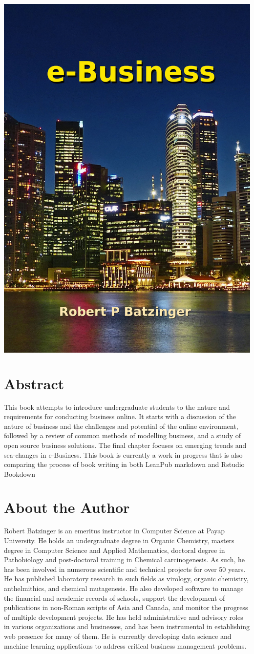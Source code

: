 \documentclass[]{book}
\begin{document}
\includegraphics[width=0.5\linewidth]{images/cover11}

\hypertarget{abstract}{%
\section*{Abstract}\label{abstract}}

This book attempts to introduce undergraduate students to the nature and requirements for conducting business online. It starts with a discussion of the nature of business and the challenges and potential of the online environment, followed by a review of common methods of modelling business, and a study of open source business solutions.
The final chapter focuses on emerging trends and sea-changes in e-Business. This book is currently a work in progress that is also comparing the process of book writing in both LeanPub markdown and Rstudio Bookdown

\hypertarget{about-the-author}{%
\section*{About the Author}\label{about-the-author}}

Robert Batzinger is an emeritus instructor in Computer Science at Payap University. He holds an undergraduate degree in Organic Chemistry, masters degree in Computer Science and Applied Mathematics, doctoral degree in Pathobiology and post-doctoral training in Chemical carcinogenesis. As such, he has been involved in numerous scientific and technical projects for over 50 years. He has published laboratory research in such fields as virology, organic chemistry, anthelmithics, and chemical mutagenesis. He also developed software to manage the financial and academic records of schools, support the development of publications in non-Roman scripts of Asia and Canada, and monitor the progress of multiple development projects. He has held administrative and advisory roles in various organizations and businesses, and has been instrumental in establishing web presence for many of them. He is currently developing data science and machine learning applications to address critical business management problems.
\end{document}
